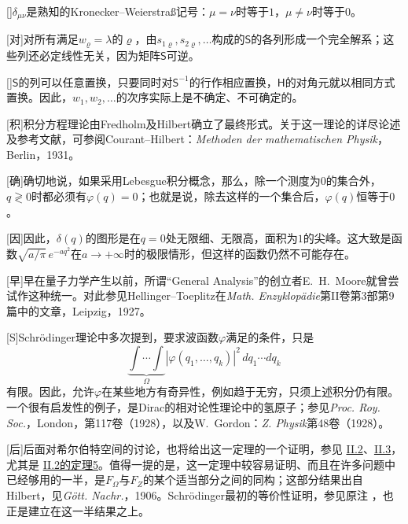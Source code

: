 \documentclass[fontsize=13pt,twoside,openany,headings=normal,parskip=false,bookmarkpackage=false,DIV=calc]{scrbook}
\begin{document}
[]{$\delta_{\mu\nu}$是熟知的Kronecker–Weierstraß记号：$\mu=\nu$时等于$1$，$\mu\ne\nu$时等于$0$。}

[对]{对所有满足$w_\varrho=\lambda$的$\varrho$，由$s_{1\varrho},\allowbreak s_{2\varrho},\allowbreak \ldots$构成的$\mathsf S$的各列形成一个完全解系；这些列还必定线性无关，因为矩阵$\mathsf S$可逆。}

[]{$\mathsf S$的列可以任意置换，只要同时对$\mathsf S^{-1}$的行作相应置换，$\mathsf H$的对角元就以相同方式置换。因此，$w_1,\allowbreak w_2,\allowbreak \ldots$的次序实际上是不确定、不可确定的。}

[积]{积分方程理论由Fredholm及Hilbert确立了最终形式。关于这一理论的详尽论述及参考文献，可参阅Courant–Hilbert：\emph{Methoden der mathematischen Physik}，Berlin，1931。}

[确]{确切地说，如果采用Lebesgue积分概念，那么，除一个测度为$0$的集合外，$q\gtrless0$时都必须有$\varphi(q)=0$；也就是说，除去这样的一个集合后，$\varphi(q)$恒等于$0$。}

[因]{因此，$\delta(q)$的图形是在$q=0$处无限细、无限高，面积为$1$的尖峰。这大致是函数$\sqrt{a/\pi}\,e^{-aq^2}$在$a\to+\infty$时的极限情形，但这样的函数仍然不可能存在。}

[早]{早在量子力学产生以前，所谓“General Analysis”的创立者E.~H.~Moore就曾尝试作这种统一。对此参见Hellinger–Toeplitz在\emph{Math. Enzyklopädie}第II卷第3部第9篇中的文章，Leipzig，1927。}

[S]{Schrödinger理论中多次提到，要求波函数$\varphi$满足的条件，只是
\[
\underbrace{\int\cdots\int}_{\Omega}|\varphi(q_1,\ldots,q_k)|^2\,dq_1\cdots dq_k
\]
有限。因此，允许$\varphi$在某些地方有奇异性，例如趋于无穷，只须上述积分仍有限。一个很有启发性的例子，是Dirac的相对论性理论中的氢原子；\hypertarget{origpage-241}{}\label{origpage-241}参见\emph{Proc. Roy. Soc.}，London，第117卷（1928），以及W.~Gordon：\emph{Z. Physik}第48卷（1928）。}

[后]{后面对希尔伯特空间的讨论，也将给出这一定理的一个证明，参见 \hyperref[sec:II.2]{II.2}、\hyperref[sec:II.3]{II.3}，尤其是 \hyperref[thm:II.5]{II.2的定理5}。值得一提的是，这一定理中较容易证明、而且在许多问题中已经够用的一半，是$F_\Omega$与$F_Z$的某个适当部分之间的同构；这部分结果出自Hilbert，见\emph{Gött. Nachr.}，1906。Schrödinger最初的等价性证明，参见原注 \hyperlink{note-7}{}，也正是建立在这一半结果之上。}
\end{document}
